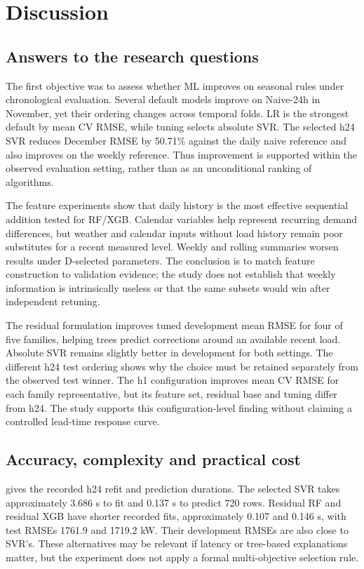 \section{Discussion}\label{sec:discussion}
\subsection{Answers to the research questions}
The first objective was to assess whether ML improves on seasonal rules under chronological evaluation. Several default models improve on Naive-24h in November, yet their ordering changes across temporal folds. LR is the strongest default by mean CV RMSE, while tuning selects absolute SVR. The selected h24 SVR reduces December RMSE by \num{50.71}\% against the daily naive reference and also improves on the weekly reference. Thus improvement is supported within the observed evaluation setting, rather than as an unconditional ranking of algorithms.

The feature experiments show that daily history is the most effective sequential addition tested for RF/XGB. Calendar variables help represent recurring demand differences, but weather and calendar inputs without load history remain poor substitutes for a recent measured level. Weekly and rolling summaries worsen results under D-selected parameters. The conclusion is to match feature construction to validation evidence; the study does not establish that weekly information is intrinsically useless or that the same subsets would win after independent retuning.

The residual formulation improves tuned development mean RMSE for four of five families, helping trees predict corrections around an available recent load. Absolute SVR remains slightly better in development for both settings. The different h24 test ordering shows why the choice must be retained separately from the observed test winner. The h1 configuration improves mean CV RMSE for each family representative, but its feature set, residual base and tuning differ from h24. The study supports this configuration-level finding without claiming a controlled lead-time response curve.

\subsection{Accuracy, complexity and practical cost}
 gives the recorded h24 refit and prediction durations. The selected SVR takes approximately \num{3.686} s to fit and \num{0.137} s to predict 720 rows. Residual RF and residual XGB have shorter recorded fits, approximately \num{0.107} and \num{0.146} s, with test RMSEs \num{1761.9} and \num{1719.2} kW. Their development RMSEs are also close to SVR's. These alternatives may be relevant if latency or tree-based explanations matter, but the experiment does not apply a formal multi-objective selection rule.


